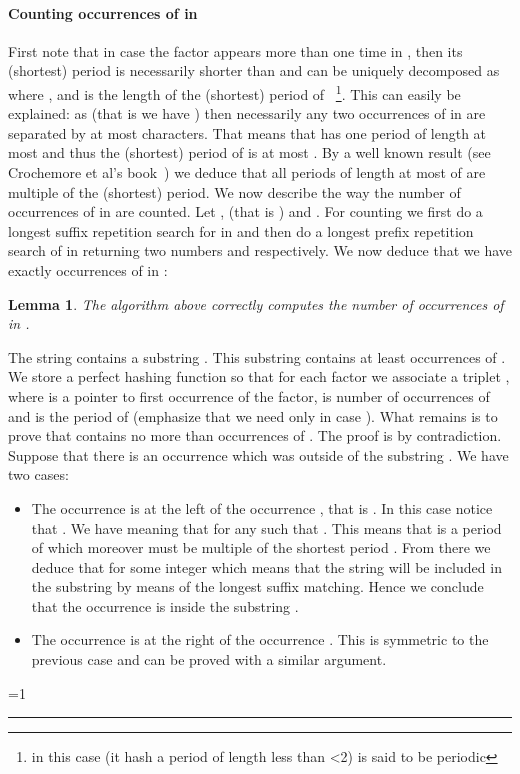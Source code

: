 \documentclass{article}
\newcommand{\?}{\mskip1.5mu}
\newcounter{noqed}
\newcommand{\qed}{ \ifmmode\mbox{
}\fi\rule[-.05em]{.3em}{.7em}\setcounter{noqed}{0}}
\newenvironment{proof}[1][{}]{\noindent{\bf Proof#1.
}\setcounter{noqed}{1}}{\ifnum\value{noqed}=1\qed\fi\par\medskip}
\newtheorem{lemma}{Lemma}
\begin{document}
\paragraph{Counting occurrences of  in }
First note that in case the factor  appears more than one time in , then its (shortest) period is necessarily shorter than    and can be uniquely decomposed as  where ,  and  is the length of the (shortest) period of ~\footnote{ in this case (it hash a period of length less than <2) is said to be periodic}. This can easily be explained: as  (that is we have ) then necessarily any two occurrences of  in  are separated by at most  characters. That means that   has one period of length at most  and thus the (shortest) period of  is at most . By a well known result (see Crochemore et al's book~\cite[Lemma 1.6]{CHL07}) we deduce that all periods of length at most  of  are multiple of the (shortest) period.
We now describe the way the number of occurrences of  in  are counted. Let ,  (that is ) and . For counting we first do a longest suffix repetition search for  in  and then do a longest prefix repetition search of  in  returning two numbers  and  respectively. We now deduce that we have exactly  occurrences of  in :
\begin{lemma}
The algorithm above correctly computes the number of occurrences of  in . 
\end{lemma}
\begin{proof}
The string  contains a substring . This substring contains at least  occurrences of . We store a perfect hashing function so that for each factor  we associate a triplet , where  is a pointer to first occurrence of the factor,  is number of occurrences of  and  is the period of  (emphasize that we need  only in case ). 
What remains is to prove that  contains no more than  occurrences of . The proof is by contradiction. Suppose that there is an occurrence  which was outside of the substring . We have two cases:
\begin{itemize}
\item The occurrence  is at the left of the occurrence , that is . In this case notice that . We have  meaning that  for any  such that . This means that  is a period of  which moreover must be multiple of the shortest period . From there we deduce that  for some integer  which means that the string  will be included in the substring  by means of the longest suffix matching. Hence we conclude that the occurrence   is inside the substring . 
\item The occurrence  is at the right of the occurrence . This is symmetric to the previous case and can be proved with a similar argument. 
\end{itemize}
\end{proof}
\end{document}
